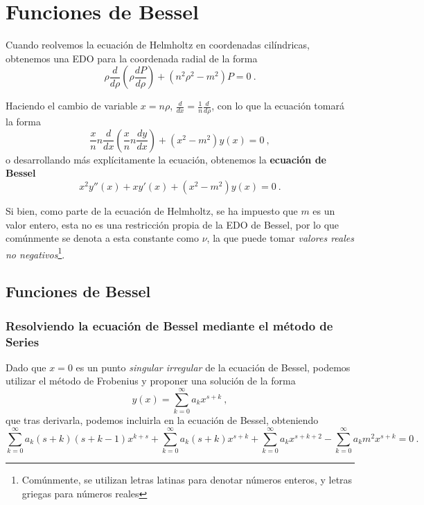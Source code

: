 \chapter{Funciones de Bessel}

Cuando reolvemos la ecuación de Helmholtz en coordenadas cilíndricas, obtenemos una EDO para la coordenada radial de la forma
\begin{equation}
    \rho \frac{d}{d\rho}\left( \rho \frac{dP}{d\rho} \right) + (n^2\rho^2 - m^2)P = 0 \ .
\end{equation}

Haciendo el cambio de variable $x = n\rho$, $\frac{d}{dx} = \frac{1}{n} \frac{d}{d\rho}$, con lo que la ecuación tomará la forma
\begin{equation}
    \frac{x}{n} n \frac{d}{dx} \left( \frac{x}{n} n \frac{dy}{dx} \right) + (x^2 - m^2)y(x) = 0 \ ,
\end{equation}
o desarrollando más explícitamente la ecuación, obtenemos la \textbf{ecuación de Bessel}
\begin{equation}
    x^2 y''(x) + x y'(x) + (x^2 - m^2) y(x) = 0 \ .
\end{equation}

Si bien, como parte de la ecuación de Helmholtz, se ha impuesto que $m$ es un valor entero, esta no es una restricción propia de la EDO de Bessel, por lo que comúnmente se denota a esta constante como $\nu$, la que puede tomar \emph{valores reales no negativos}\footnote{Comúnmente, se utilizan letras latinas para denotar números enteros, y letras griegas para números reales}.

\section{Funciones de Bessel}

\subsection{Resolviendo la ecuación de Bessel mediante el método de Series}

Dado que $x=0$ es un punto \emph{singular irregular} de la ecuación de Bessel, podemos utilizar el método de Frobenius y proponer una solución de la forma
\begin{equation}
    y(x) = \sum_{k = 0}^\infty a_k x^{s+k} \ ,
\end{equation}
que tras derivarla, podemos incluirla en la ecuación de Bessel, obteniendo
\begin{equation}
    \sum_{k = 0}^\infty a_k (s + k)(s+ k - 1)x^{k + s} + \sum_{k = 0}^\infty a_k (s+k) x^{s+k} + \sum_{k = 0}^\infty a_{k} x^{s+k + 2} - \sum_{k = 0}^\infty a_k m^2 x^{s+k} = 0 \ .
\end{equation}

